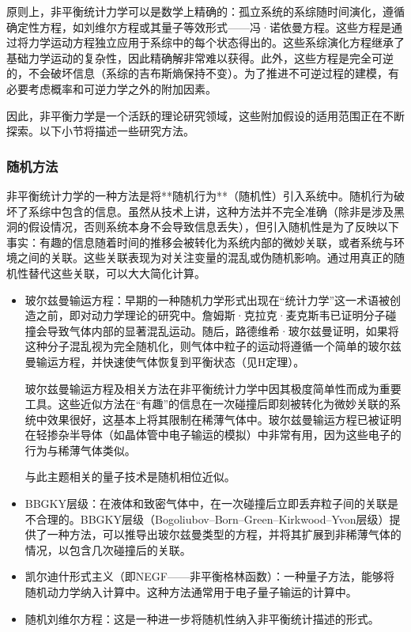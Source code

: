 原则上，非平衡统计力学可以是数学上精确的：孤立系统的系综随时间演化，遵循确定性方程，如刘维尔方程或其量子等效形式——冯·诺依曼方程。这些方程是通过将力学运动方程独立应用于系综中的每个状态得出的。这些系综演化方程继承了基础力学运动的复杂性，因此精确解非常难以获得。此外，这些方程是完全可逆的，不会破坏信息（系综的吉布斯熵保持不变）。为了推进不可逆过程的建模，有必要考虑概率和可逆力学之外的附加因素。

因此，非平衡力学是一个活跃的理论研究领域，这些附加假设的适用范围正在不断探索。以下小节将描述一些研究方法。
\subsubsection{随机方法}
非平衡统计力学的一种方法是将**随机行为**（随机性）引入系统中。随机行为破坏了系综中包含的信息。虽然从技术上讲，这种方法并不完全准确（除非是涉及黑洞的假设情况，否则系统本身不会导致信息丢失），但引入随机性是为了反映以下事实：有趣的信息随着时间的推移会被转化为系统内部的微妙关联，或者系统与环境之间的关联。这些关联表现为对关注变量的混乱或伪随机影响。通过用真正的随机性替代这些关联，可以大大简化计算。

\begin{itemize}
\item 玻尔兹曼输运方程：早期的一种随机力学形式出现在“统计力学”这一术语被创造之前，即对动力学理论的研究中。詹姆斯·克拉克·麦克斯韦已证明分子碰撞会导致气体内部的显著混乱运动。随后，路德维希·玻尔兹曼证明，如果将这种分子混乱视为完全随机化，则气体中粒子的运动将遵循一个简单的玻尔兹曼输运方程，并快速使气体恢复到平衡状态（见H定理）。

  玻尔兹曼输运方程及相关方法在非平衡统计力学中因其极度简单性而成为重要工具。这些近似方法在“有趣”的信息在一次碰撞后即刻被转化为微妙关联的系统中效果很好，这基本上将其限制在稀薄气体中。玻尔兹曼输运方程已被证明在轻掺杂半导体（如晶体管中电子输运的模拟）中非常有用，因为这些电子的行为与稀薄气体类似。

 与此主题相关的量子技术是随机相位近似。

\item BBGKY层级：在液体和致密气体中，在一次碰撞后立即丢弃粒子间的关联是不合理的。BBGKY层级（Bogoliubov–Born–Green–Kirkwood–Yvon层级）提供了一种方法，可以推导出玻尔兹曼类型的方程，并将其扩展到非稀薄气体的情况，以包含几次碰撞后的关联。
\item 凯尔迪什形式主义（即NEGF——非平衡格林函数）：一种量子方法，能够将随机动力学纳入计算中。这种方法通常用于电子量子输运的计算中。
\item 随机刘维尔方程：这是一种进一步将随机性纳入非平衡统计描述的形式。
\end{itemize}
